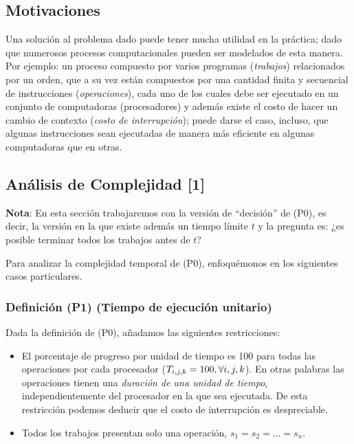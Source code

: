 \documentclass[14pt]{extarticle}
\begin{document}
\subsection*{Motivaciones}

Una solución al problema dado puede tener mucha utilidad en la práctica; dado que numerosos procesos computacionales pueden ser modelados de esta manera. Por ejemplo: un proceso compuesto por varios programas (\textit{trabajos}) relacionados por un orden, que a su vez están compuestos por una cantidad finita y secuencial de instrucciones (\textit{operaciones}), cada uno de los cuales debe ser ejecutado en un conjunto de computadoras (procesadores) y además existe el costo de hacer un cambio de contexto (\textit{costo de interrupción}); puede darse el caso, incluso, que algunas instrucciones sean ejecutadas de manera más eficiente en algunas computadoras que en otras.

\subsection*{Análisis de Complejidad [1]}

\textbf{Nota}: En esta sección trabajaremos con la versión de ``decisión'' de (P0), es decir, la versión en la que existe además un tiempo límite $t$ y la pregunta es: ¿es posible terminar todos los trabajos antes de $t$?

Para analizar la complejidad temporal de (P0), enfoquémonos en los siguientes casos particulares.

\subsubsection*{Definición (P1) (Tiempo de ejecución unitario)}

Dada la definición de (P0), añadamos las siguientes restricciones:

\begin{itemize}
    \item El porcentaje de progreso por unidad de tiempo es 100 para todas las operaciones por cada procesador ($T_{i, j, k} = 100, \space \forall i, j, k$). En otras palabras las operaciones tienen una \textit{duración de una unidad de tiempo}, independientemente del procesador en la que sea ejecutada. De esta restricción podemos deducir que el costo de interrupción es despreciable.
    \item Todos los trabajos presentan solo una operación, $s_1 = s_2 = \ldots = s_n$.
\end{itemize}
\end{document}
